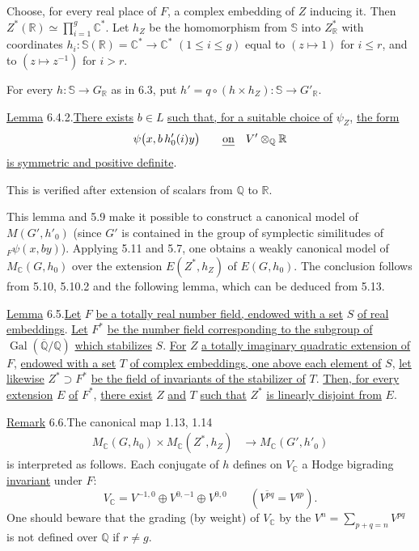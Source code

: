 \documentclass[10pt]{article}
\newcommand{\C}{\mathbb C}
\newcommand{\Q}{\mathbb Q}
\newcommand{\R}{\mathbb R}
\newcommand{\bS}{\mathbb S}
\newcommand{\Gal}{\operatorname{Gal}}
\newcommand{\MC}{M_{\C}}
\begin{document}
Choose, for every real place of $F$, a complex embedding of $Z$
inducing it. Then $\displaystyle Z^*(\R)\simeq\prod_{i=1}^g \C^*$. Let $h_Z$ be the homomorphism from $\bS$ into $Z^*_\R$ with coordinates $h_i:\bS(\R)=\C^*\longrightarrow\C^*$ $(1\le i\le g)$ equal to $(z\mapsto1)$ for $i\le r$, and to $(z\mapsto z^{-1})$ for $i>r$.

For every $h:\bS\to G_\R$ as in 6.3, put $h'=q\circ(h\times h_Z):\bS\longrightarrow G'_\R$.

\noindent \uline{Lemma} 6.4.2.\quad \uline{There exists} $b\in L$ \uline{such that, for a suitable choice of} $\psi_Z$, \uline{the form}
\[
\psi\bigl(x,b\,h'_0(i)y\bigr)\qquad\text{\uline{on}}\quad V'\otimes_\Q\R
\]
\uline{is symmetric and positive definite}.

This is verified after extension of scalars from $\Q$ to $\R$.

This lemma and 5.9 make it possible to construct a canonical model of $M(G',h'_0)$ (since $G'$ is contained in the group of symplectic similitudes of ${}_F\psi(x,by)$). Applying 5.11 and 5.7, one obtains a weakly canonical model of $\MC(G,h_0)$ over the extension $E(Z^*,h_Z)$ of $E(G,h_0)$. The conclusion follows from 5.10, 5.10.2 and the following lemma, which can be deduced from 5.13.

\noindent \uline{Lemma} 6.5.\quad \uline{Let} $F$ \uline{be a totally real number field, endowed with a set} $S$ \uline{of real embeddings}. \uline{Let} $F^\ast$ \uline{be the number field corresponding to the subgroup of} $\Gal(\overline{\Q}/\Q)$ \uline{which stabilizes} $S$. \uline{For} $Z$ \uline{a totally imaginary quadratic extension of} $F$, \uline{endowed with a set} $T$ \uline{of complex embeddings, one above each element of} $S$, \uline{let likewise} $Z^\ast\supset F^\ast$ \uline{be the field of invariants of the stabilizer of} $T$. \uline{Then, for every extension} $E$ \uline{of} $F^\ast$, \uline{there exist} $Z$ \uline{and} $T$ \uline{such that} $Z^\ast$ \uline{is linearly disjoint from} $E$.

\noindent \uline{Remark} 6.6.\quad The canonical map 1.13, 1.14
\begingroup
\makeatletter
\tagsleft@true
\makeatother
\begin{align}
\MC(G,h_0)\times\MC(Z^*,h_Z)&\longrightarrow\MC(G',h'_0) \tag{6.6.1}
\end{align}
\endgroup
is interpreted as follows. Each conjugate of $h$ defines on $V_{\C}$ a
Hodge bigrading \uline{invariant} under $F$:
\[
V_{\C}=V^{-1,0}\oplus V^{0,-1}\oplus V^{0,0}
\qquad(\overline{V^{pq}}=V^{qp}).
\]
One should beware that the grading (by weight) of $V_{\C}$ by the
$\displaystyle V^n=\sum_{p+q=n}V^{pq}$ is not defined over $\Q$ if $r\ne g$.
\end{document}
